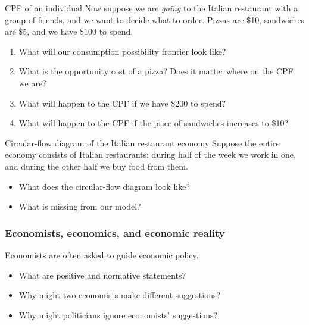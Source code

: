 \documentclass[compress]{beamer}
\begin{document}
\begin{frame}{CPF of an individual}
    Now suppose we are \textit{going} to the Italian restaurant with a group of friends, and we want to decide what to order. Pizzas are \$10, sandwiches are \$5, and we have \$100 to spend.
    \begin{enumerate}
        \item What will our consumption possibility frontier look like?
        \item What is the opportunity cost of a pizza? Does it matter where on the CPF we are?
        \item What will happen to the CPF if we have \$200 to spend?
        \item What will happen to the CPF if the price of sandwiches increases to \$10?
    \end{enumerate}
\end{frame}

\begin{frame}{Circular-flow diagram of the Italian restaurant economy}
    Suppose the entire economy consists of Italian restaurants: during half of the week we work in one, and during the other half we buy food from them.

    \medskip

    \begin{itemize}
        \item What does the circular-flow diagram look like?
        \item What is missing from our model?
    \end{itemize}

\end{frame}

\begin{frame}
    \frametitle{Economists, economics, and economic reality}    
    Economists are often asked to guide economic policy.
    \begin{itemize}
        \item What are positive and normative statements?
        \item Why might two economists make different suggestions?
        \item Why might politicians ignore economists' suggestions?
    \end{itemize}
\end{frame}
\end{document}
